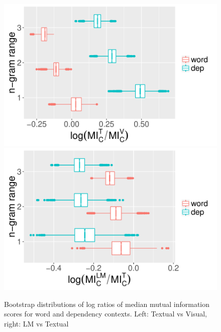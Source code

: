 \begin{figure}
  \centering
  \includegraphics[scale=0.4]{bootstrappedMI.pdf}
  \includegraphics[scale=0.4]{bootstrappedMI2.pdf}
  \caption{Bootstrap distributions of log ratios of median mutual
    information scores for word and dependency contexts. Left: {\sc Textual}
      vs {\sc Visual}, right: {\sc LM} vs {\sc Textual}}
  \label{fig:mi-boot}
  \vspace{-.2cm}
\end{figure}








